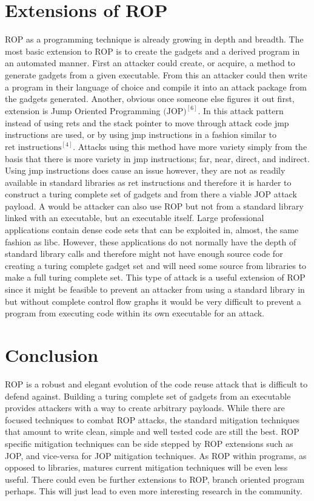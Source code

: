 \documentclass[11pt]{amsart}
\begin{document}
\section*{Extensions of ROP}
ROP as a programming technique is already growing in depth and breadth. The most basic extension to ROP is to create the gadgets and a derived program in an automated manner. First an attacker could create, or acquire, a method to generate gadgets from a given executable. From this an attacker could then write a program in their language of choice and compile it into an attack package from the gadgets generated.\newline \newline
Another, obvious once someone else figures it out first, extension is Jump Oriented Programming $\text{(JOP)}^{[6]}$. In this attack pattern instead of using rets and the stack pointer to move through attack code jmp instructions are used, or by using jmp instructions in a fashion similar to $\text{ret instructions}^{[4]}$. Attacks using this method have more variety simply from the basis that there is more variety in jmp instructions; far, near, direct, and indirect. Using jmp instructions does cause an issue however, they are not as readily available in standard libraries as ret instructions and therefore it is harder to construct a turing complete set of gadgets and from there a viable JOP attack payload.\newline \newline
A would be attacker can also use ROP but not from a standard library linked with an executable, but an executable itself. Large professional applications contain dense code sets that can be exploited in, almost, the same fashion as libc. However, these applications do not normally have the depth of standard library calls and therefore might not have enough source code for creating a turing complete gadget set and will need some source from libraries to make a full turing complete set. This type of attack is a useful extension of ROP since it might be feasible to prevent an attacker from using a standard library in but without complete control flow graphs it would be very difficult to prevent a program from executing code within its own executable for an attack.
\section*{Conclusion}
ROP is a robust and elegant evolution of the code reuse attack that is difficult to defend against. Building a turing complete set of gadgets from an executable provides attackers with a way to create arbitrary payloads. While there are focused techniques to combat ROP attacks, the standard mitigation techniques that amount to write clean, simple and well tested code are still the best. ROP specific mitigation techniques can be side stepped by ROP extensions such as JOP, and vice-versa for JOP mitigation techniques. As ROP within programs, as opposed to libraries, matures current mitigation techniques will be even less useful. There could even be further extensions to ROP, branch oriented program perhaps. This will just lead to even more interesting research in the community.
\end{document}
